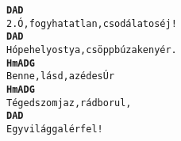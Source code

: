 \begin{minipage}{\textwidth}
\kottastart
{}
\kottaend
\begin{minipage}{\textwidth}
\begin{multicols}{2}
\begin{minipage}{\textwidth}
\begin{alltt}
\textbf{   D                      A    D}
2. Ó, fogyhatatlan, csodálatos éj!
\textbf{    D                       A    D}
   Hópehely ostya, csöpp búzakenyér.
\textbf{    Hm     A       D    G}
   Benne, lásd, az édes Úr
\textbf{    Hm     A       D     G}
   Téged szomjaz, rád borul,
\textbf{   D      A     D}
   Egy világgal ér fel!
\end{alltt}
\vspace{0.0cm}
\versszakspacing
\end{minipage}
\vspace{0.2cm}
\end{multicols}
\end{minipage}

\end{minipage}
~\vspace{1.0cm}
\newline

